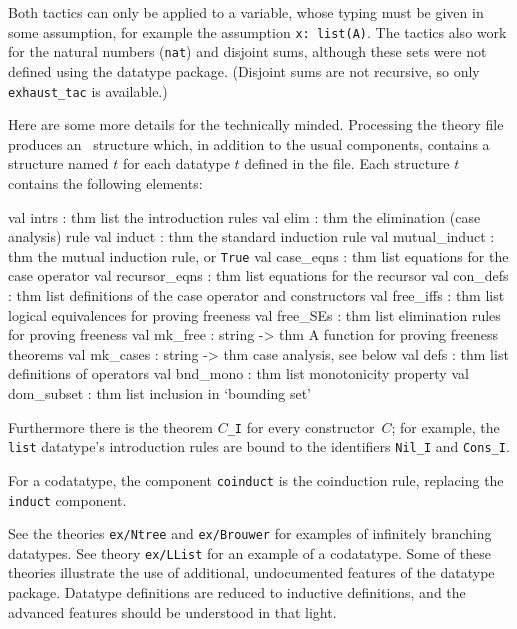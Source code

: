 Both tactics can only be applied to a variable, whose typing must be given in
some assumption, for example the assumption \texttt{x:\ list(A)}.  The tactics
also work for the natural numbers (\texttt{nat}) and disjoint sums, although
these sets were not defined using the datatype package.  (Disjoint sums are
not recursive, so only \texttt{exhaust_tac} is available.)

\bigskip
Here are some more details for the technically minded.  Processing the
theory file produces an \ML\ structure which, in addition to the usual
components, contains a structure named $t$ for each datatype $t$ defined in
the file.  Each structure $t$ contains the following elements:
\begin{ttbox}
val intrs         : thm list  \textrm{the introduction rules}
val elim          : thm       \textrm{the elimination (case analysis) rule}
val induct        : thm       \textrm{the standard induction rule}
val mutual_induct : thm       \textrm{the mutual induction rule, or \texttt{True}}
val case_eqns     : thm list  \textrm{equations for the case operator}
val recursor_eqns : thm list  \textrm{equations for the recursor}
val con_defs      : thm list  \textrm{definitions of the case operator and constructors}
val free_iffs     : thm list  \textrm{logical equivalences for proving freeness}
val free_SEs      : thm list  \textrm{elimination rules for proving freeness}
val mk_free       : string -> thm  \textrm{A function for proving freeness theorems}
val mk_cases      : string -> thm  \textrm{case analysis, see below}
val defs          : thm list  \textrm{definitions of operators}
val bnd_mono      : thm list  \textrm{monotonicity property}
val dom_subset    : thm list  \textrm{inclusion in `bounding set'}
\end{ttbox}
Furthermore there is the theorem $C$\texttt{_I} for every constructor~$C$; for
example, the \texttt{list} datatype's introduction rules are bound to the
identifiers \texttt{Nil_I} and \texttt{Cons_I}.

For a codatatype, the component \texttt{coinduct} is the coinduction rule,
replacing the \texttt{induct} component.

See the theories \texttt{ex/Ntree} and \texttt{ex/Brouwer} for examples of
infinitely branching datatypes.  See theory \texttt{ex/LList} for an example
of a codatatype.  Some of these theories illustrate the use of additional,
undocumented features of the datatype package.  Datatype definitions are
reduced to inductive definitions, and the advanced features should be
understood in that light.


